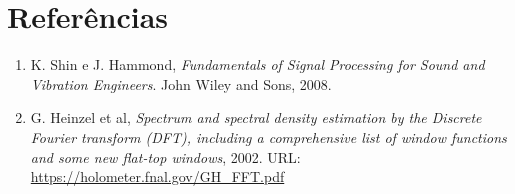 \documentclass[a4paper,twoside,12pt]{article}
\begin{document}
	\section*{Referências}
	
	\begin{enumerate}
		\item K. Shin e J. Hammond, \textit{Fundamentals of Signal Processing for Sound and Vibration Engineers}. John Wiley and Sons, 2008.
		\item G. Heinzel et al, \textit{Spectrum and spectral density estimation by the Discrete Fourier transform (DFT), including a comprehensive list of window functions and some new flat-top windows}, 2002. URL: \url{https://holometer.fnal.gov/GH_FFT.pdf}
	\end{enumerate}
	
\end{document}
